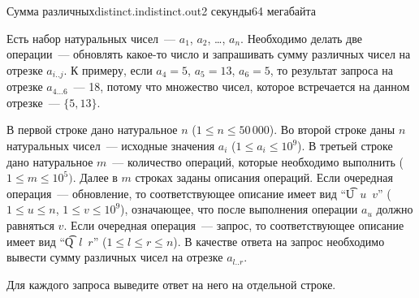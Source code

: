 \begin{problem}{Сумма различных}{distinct.in}{distinct.out}{2 секунды}{64 мегабайта}


Есть набор натуральных чисел~--- $a_1$, $a_2$, \ldots, $a_n$.
Необходимо делать две операции~--- обновлять какое-то число и запрашивать сумму различных чисел на
отрезке $a_{i .. j}$. К примеру, если $a_4 = 5$, $a_5 = 13$, $a_6 = 5$, то результат запроса на отрезке
$a_{4 \ldots 6}$~--- 18, потому что множество чисел, которое встречается на данном отрезке~--- $\{5, 13\}$.

\InputFile

В первой строке дано натуральное $n$ ($1 \le n \le 50\,000$).
Во второй строке даны $n$ натуральных чисел~--- исходные значения $a_i$ ($1 \le a_i \le 10^9$).
В третьей строке дано натуральное $m$~--- количество операций, которые необходимо выполнить ($1 \le m \le 10^5)$.
Далее в $m$ строках заданы описания операций. Если очередная операция~--- обновление, то соответствующее описание
имеет вид ``\t{U~$u$~$v$}'' ($1 \le u \le n$, $1 \le v \le 10^9$),
означающее, что после выполнения операции $a_u$ должно равняться $v$. Если очередная
операция~--- запрос, то соответствующее описание имеет вид ``\t{Q~$l$~$r$}'' ($1 \le l \le r \le n$).
В качестве ответа на запрос необходимо вывести сумму различных чисел на отрезке $a_{l .. r}$.

\OutputFile

Для каждого запроса выведите ответ на него на отдельной строке.

\Example

\begin{example}
%
\end{example}

\end{problem}
